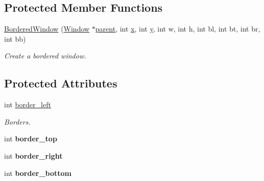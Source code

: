 \subsection*{Protected Member Functions}
\begin{DoxyCompactItemize}
\item 
\hypertarget{classGUI_1_1BorderedWindow_a6e2e1cbbc8a073b4ddac62086e003d46}{\hyperlink{classGUI_1_1BorderedWindow_a6e2e1cbbc8a073b4ddac62086e003d46}{Bordered\-Window} (\hyperlink{classGUI_1_1Window}{Window} $\ast$\hyperlink{classGUI_1_1Window_a2e593ff65e7702178d82fe9010a0b539}{parent}, int \hyperlink{classGUI_1_1Window_a6ca6a80ca00c9e1d8ceea8d3d99a657d}{x}, int \hyperlink{classGUI_1_1Window_a0ee8e923aff2c3661fc2e17656d37adf}{y}, int w, int h, int bl, int bt, int br, int bb)}\label{classGUI_1_1BorderedWindow_a6e2e1cbbc8a073b4ddac62086e003d46}

\begin{DoxyCompactList}\small\item\em Create a bordered window. \end{DoxyCompactList}\end{DoxyCompactItemize}
\subsection*{Protected Attributes}
\begin{DoxyCompactItemize}
\item 
\hypertarget{classGUI_1_1BorderedWindow_aee7cb08a129656be54ca7c80f6a1e773}{int \hyperlink{classGUI_1_1BorderedWindow_aee7cb08a129656be54ca7c80f6a1e773}{border\-\_\-left}}\label{classGUI_1_1BorderedWindow_aee7cb08a129656be54ca7c80f6a1e773}

\begin{DoxyCompactList}\small\item\em Borders. \end{DoxyCompactList}\item 
\hypertarget{classGUI_1_1BorderedWindow_ae68c7db90609df20c166ccff4fedcbd4}{int {\bfseries border\-\_\-top}}\label{classGUI_1_1BorderedWindow_ae68c7db90609df20c166ccff4fedcbd4}

\item 
\hypertarget{classGUI_1_1BorderedWindow_a3d1e6ac0d63e78e79900129f6e6a07c3}{int {\bfseries border\-\_\-right}}\label{classGUI_1_1BorderedWindow_a3d1e6ac0d63e78e79900129f6e6a07c3}

\item 
\hypertarget{classGUI_1_1BorderedWindow_a2daa40a7c446a6753d39f5a3096546b9}{int {\bfseries border\-\_\-bottom}}\label{classGUI_1_1BorderedWindow_a2daa40a7c446a6753d39f5a3096546b9}

\end{DoxyCompactItemize}


